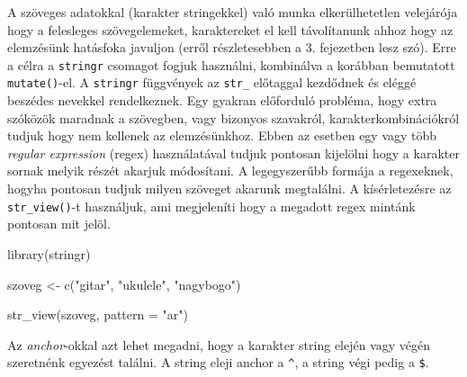 \documentclass[
]{book}
\newenvironment{Shaded}{\begin{snugshade}}{\end{snugshade}}
\newcommand{\AttributeTok}[1]{\textcolor[rgb]{0.77,0.63,0.00}{#1}}
\newcommand{\FunctionTok}[1]{\textcolor[rgb]{0.00,0.00,0.00}{#1}}
\newcommand{\NormalTok}[1]{#1}
\newcommand{\OtherTok}[1]{\textcolor[rgb]{0.56,0.35,0.01}{#1}}
\newcommand{\StringTok}[1]{\textcolor[rgb]{0.31,0.60,0.02}{#1}}
\begin{document}
A szöveges adatokkal (karakter stringekkel) való munka elkerülhetetlen
velejárója hogy a felesleges szövegelemeket, karaktereket el kell
távolítanunk ahhoz hogy az elemzésünk hatásfoka javuljon (erről
részletesebben a 3. fejezetben lesz szó). Erre a célra a
\texttt{stringr} csomagot fogjuk használni, kombinálva a korábban
bemutatott \texttt{mutate()}-el. A \texttt{stringr} függvények az
\texttt{str\_} előtaggal kezdődnek és eléggé beszédes nevekkel
rendelkeznek. Egy gyakran előforduló probléma, hogy extra szóközök
maradnak a szövegben, vagy bizonyos szavakról, karakterkombinációkról
tudjuk hogy nem kellenek az elemzésünkhoz. Ebben az esetben egy vagy
több \emph{regular expression} (regex) használatával tudjuk pontosan
kijelölni hogy a karakter sornak melyik részét akarjuk módosítani. A
legegyszerűbb formája a regexeknek, hogyha pontosan tudjuk milyen
szöveget akarunk megtalálni. A kísérletezésre az \texttt{str\_view()}-t
használjuk, ami megjeleníti hogy a megadott regex mintánk pontosan mit
jelöl.

\begin{Shaded}
\begin{Highlighting}[]
\FunctionTok{library}\NormalTok{(stringr)}
\end{Highlighting}
\end{Shaded}

\begin{Shaded}
\begin{Highlighting}[]
\NormalTok{szoveg }\OtherTok{\textless{}{-}} \FunctionTok{c}\NormalTok{(}\StringTok{"gitar"}\NormalTok{, }\StringTok{"ukulele"}\NormalTok{, }\StringTok{"nagybogo"}\NormalTok{)}

\FunctionTok{str\_view}\NormalTok{(szoveg, }\AttributeTok{pattern =} \StringTok{"ar"}\NormalTok{)}
\end{Highlighting}
\end{Shaded}

Az \emph{anchor}-okkal azt lehet megadni, hogy a karakter string elején
vagy végén szeretnénk egyezést találni. A string eleji anchor a
\texttt{\^{}}, a string végi pedig a \texttt{\$}.

\begin{Shaded}
\end{Shaded}
\end{document}
